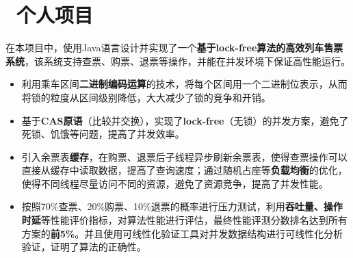 \documentclass{resume}
\begin{document}
  \section{\faUsers\ 个人项目} 
 在本项目中，使用Java语言设计并实现了一个\textbf{基于lock-free算法的高效列车售票系统}，该系统支持查票、购票、退票等操作，并能在并发环境下保证高性能运行。
 \begin{spacing}{1.2}
    \begin{itemize} 
      \item 利用乘车区间\textbf{二进制编码运算}的技术，将每个区间用一个二进制位表示，从而将锁的粒度从区间级别降低，大大减少了锁的竞争和开销。 
      \item 基于\textbf{CAS原语}（比较并交换），实现了\textbf{lock-free}（无锁）的并发方案，避免了死锁、饥饿等问题，提高了并发效率。 
      \item 引入余票表\textbf{缓存}，在购票、退票后子线程异步刷新余票表，使得查票操作可以直接从缓存中读取数据，提高了查询速度；通过随机占座等\textbf{负载均衡}的优化，使得不同线程尽量访问不同的资源，避免了资源竞争，提高了并发性能。 
      \item 按照70\%查票、20\%购票、10\%退票的概率进行压力测试，利用\textbf{吞吐量、操作时延}等性能评价指标，对算法性能进行评估，最终性能评测分数排名达到所有方案的\textbf{前5\%}。并且使用可线性化验证工具对并发数据结构进行可线性化分析验证，证明了算法的正确性。 
    \end{itemize} 
  \end{spacing}


\end{document}
